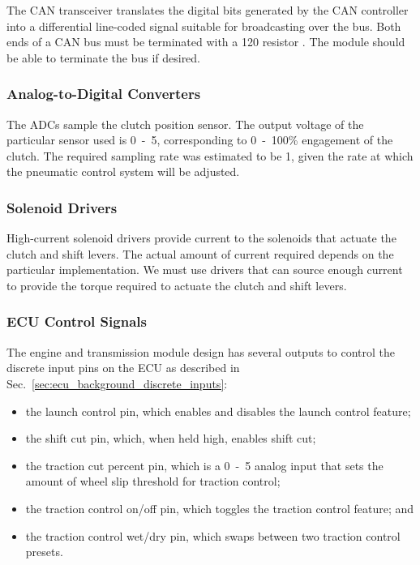 The CAN transceiver translates the digital bits generated by the CAN controller into a differential line-coded signal suitable for broadcasting over the bus. Both ends of a CAN bus must be terminated with a \unit{120}{\ohm} resistor \cite{MCP2551}. The module should be able to terminate the bus if desired.

\subsubsection{Analog-to-Digital Converters}

The ADCs sample the clutch position sensor. The output voltage of the particular sensor used is \unit{0-5}{\volt}, corresponding to \unit{0-100}{\%} engagement of the clutch. The required sampling rate was estimated to be \unit{1}{\kilo\hertz}, given the rate at which the pneumatic control system will be adjusted.

\subsubsection{Solenoid Drivers}

High-current solenoid drivers provide current to the solenoids that actuate the clutch and shift levers. The actual amount of current required depends on the particular implementation. We must use drivers that can source enough current to provide the torque required to actuate the clutch and shift levers. 
 
\subsubsection{ECU Control Signals}

The engine and transmission module design has several outputs to control the discrete input pins on the ECU as described in Sec.\ \ref{sec:ecu_background_discrete_inputs}:

\begin{itemize}
  \item the launch control pin, which enables and disables the launch control feature;
  \item the shift cut pin, which, when held high, enables shift cut;
  \item the traction cut percent pin, which is a \unit{0-5}{\volt} analog input that sets the amount of wheel slip threshold for traction control;
  \item the traction control on/off pin, which toggles the traction control feature; and
  \item the traction control wet/dry pin, which swaps between two traction control presets.
\end{itemize}

